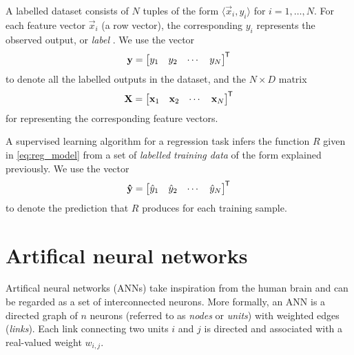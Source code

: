 \begin{definition}
    \label{def:labelled_dataset}
    A labelled dataset consists of $N$ tuples of the form $\langle \vec{x}_i, y_i\rangle$ for $i=1,\dots,N$.
    For each feature vector $\vec{x}_i$ (a row vector), the corresponding $y_i$ represents the observed output, or \textit{label} \cite{burkov2019}.
    We use the vector
    \begin{equation}
        \label{eq:sup_learn_target}
        \mathbf{y} = \begin{bmatrix}
            y_1 & y_2 & \cdots & y_N
        \end{bmatrix}^{\mkern-1.5mu\mathsf{T}}
    \end{equation}
    to denote all the labelled outputs in the dataset, and the $N \times D$ matrix
    \begin{equation}
        \label{eq:sup_learn_input_matrix}
        \mathbf{X} = \begin{bmatrix}
            \mathbf{x}_1 & \mathbf{x}_2 & \cdots & \mathbf{x}_N
        \end{bmatrix}^{\mkern-1.5mu\mathsf{T}}
    \end{equation}
    for representing the corresponding feature vectors.
\end{definition}

\begin{definition}
    \label{def:supervised_learning}
    A supervised learning algorithm for a regression task infers the function $R$ given in \ref{eq:reg_model} from a set of \textit{labelled training data} of the form explained previously. 
    We use the vector
    \begin{equation}
        \label{eq:sup_learn_prediction}
        \mathbf{\hat{y}} = \begin{bmatrix}
            \hat{y}_1 & \hat{y}_2 & \cdots & \hat{y}_N
        \end{bmatrix}^{\mkern-1.5mu\mathsf{T}}
    \end{equation}
    to denote the prediction that $R$ produces for each training sample.
\end{definition}

\section{Artifical neural networks}
\label{sec:ann}
Artifical neural networks (ANNs) take inspiration from the human brain and can be regarded as a set of interconnected neurons. 
More formally, an ANN is a directed graph of $n$ neurons (referred to as \textit{nodes} or \textit{units}) with weighted edges (\textit{links}).
Each link connecting two units $i$ and $j$ is directed and associated with a real-valued weight $w_{i,j}$. 

